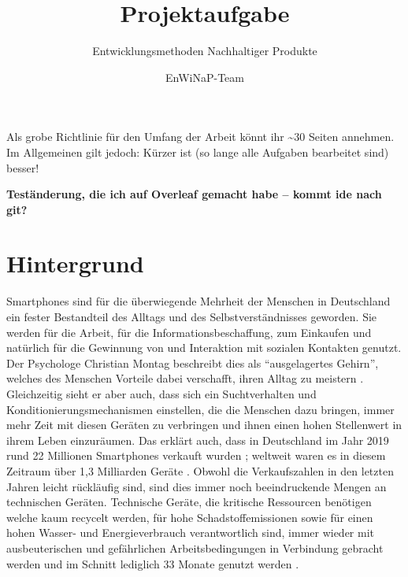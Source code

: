 \documentclass[DIV=15,headinclude=true]{scrartcl}
\begin{document}
\title{Projektaufgabe}
\subtitle{Entwicklungsmethoden Nachhaltiger Produkte}
\author{EnWiNaP-Team}
\maketitle

\tableofcontents


\begin{framed}

	Als grobe Richtlinie für den Umfang der Arbeit könnt ihr
	\textasciitilde30 Seiten annehmen. Im Allgemeinen gilt jedoch: Kürzer
	ist (so lange alle Aufgaben bearbeitet sind) besser!
	
\textbf{Teständerung, die ich auf Overleaf gemacht habe -- kommt ide nach git?}

\end{framed}

\section{Hintergrund}

Smartphones sind für die überwiegende Mehrheit der Menschen in
Deutschland ein fester Bestandteil des Alltags und des
Selbstverständnisses geworden. Sie werden für die Arbeit, für die
Informationsbeschaffung, zum Einkaufen und natürlich für die Gewinnung
von und Interaktion mit sozialen Kontakten genutzt. Der Psychologe
Christian Montag beschreibt dies als ``ausgelagertes Gehirn'', welches
des Menschen Vorteile dabei verschafft, ihren Alltag zu meistern
\cite{Spanke2019}. Gleichzeitig sieht er aber auch, dass sich ein
Suchtverhalten und Konditionierungsmechanismen einstellen, die die
Menschen dazu bringen, immer mehr Zeit mit diesen Geräten zu verbringen
und ihnen einen hohen Stellenwert in ihrem Leben einzuräumen. Das
erklärt auch, dass in Deutschland im Jahr 2019 rund 22 Millionen
Smartphones verkauft wurden \cite{Tenzer2020}; weltweit waren es in
diesem Zeitraum über 1,3 Milliarden Geräte \cite{Tenzer2020a}. Obwohl
die Verkaufszahlen in den letzten Jahren leicht rückläufig sind, sind
dies immer noch beeindruckende Mengen an technischen Geräten. Technische
Geräte, die kritische Ressourcen benötigen welche kaum recycelt werden,
für hohe Schadstoffemissionen sowie für einen hohen Wasser- und
Energieverbrauch verantwortlich sind, immer wieder mit ausbeuterischen
und gefährlichen Arbeitsbedingungen in Verbindung gebracht werden und im
Schnitt lediglich 33 Monate genutzt werden \cite{Jardim2017, Odea2020}.
\end{document}

